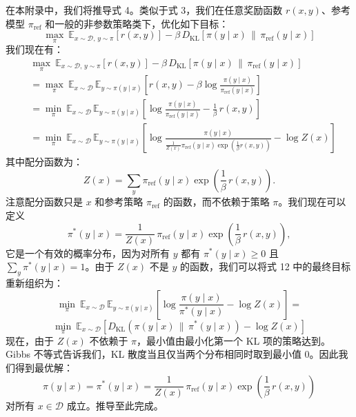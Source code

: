 \documentclass[11pt,UTF8,fontset=fandol]{ctexart}
\newcommand{\KL}{\mathrm{KL}}
\newcommand{\sref}{\mathrm{ref}}
\begin{document}
在本附录中，我们将推导式 4。类似于式 3，我们在任意奖励函数 $r(x, y)$、参考模型 $\pi_\sref$ 和一般的非参数策略类下，优化如下目标：
\begin{equation}
\max_\pi\ \mathbb{E}_{x \sim \mathcal{D},\, y \sim \pi}\left[r(x, y)\right] - \beta\, D_{\KL}\left[\pi(y \mid x) \,\|\, \pi_\sref(y \mid x)\right] \tag{11}
\end{equation}
我们现在有：
\begin{equation}
\begin{aligned}
&\max_\pi\ \mathbb{E}_{x \sim \mathcal{D},\, y \sim \pi}\left[r(x, y)\right] - \beta\, D_{\KL}\left[\pi(y \mid x) \,\|\, \pi_\sref(y \mid x)\right] \\
&= \max_\pi\ \mathbb{E}_{x \sim \mathcal{D}}\, \mathbb{E}_{y \sim \pi(y \mid x)}\left[r(x, y) - \beta \log \frac{\pi(y \mid x)}{\pi_\sref(y \mid x)}\right] \\
&= \min_\pi\ \mathbb{E}_{x \sim \mathcal{D}}\, \mathbb{E}_{y \sim \pi(y \mid x)}\left[\log \frac{\pi(y \mid x)}{\pi_\sref(y \mid x)} - \frac{1}{\beta}\, r(x, y)\right] \\
&= \min_\pi\ \mathbb{E}_{x \sim \mathcal{D}}\, \mathbb{E}_{y \sim \pi(y \mid x)}\left[\log \frac{\pi(y \mid x)}{\frac{1}{Z(x)} \pi_\sref(y \mid x) \exp\left(\frac{1}{\beta} r(x, y)\right)} - \log Z(x)\right]
\end{aligned}
\tag{12}
\end{equation}
其中配分函数为：
\[
Z(x) = \sum_y \pi_\sref(y \mid x) \exp\left(\frac{1}{\beta}\, r(x, y)\right).
\]
注意配分函数只是 $x$ 和参考策略 $\pi_\sref$ 的函数，而不依赖于策略 $\pi$。我们现在可以定义
\[
\pi^*(y \mid x) = \frac{1}{Z(x)}\, \pi_\sref(y \mid x) \exp\left(\frac{1}{\beta}\, r(x, y)\right),
\]
它是一个有效的概率分布，因为对所有 $y$ 都有 $\pi^*(y \mid x) \geq 0$ 且 $\sum_y \pi^*(y \mid x) = 1$。由于 $Z(x)$ 不是 $y$ 的函数，我们可以将式 12 中的最终目标重新组织为：
\begin{equation}
\min_\pi\ \mathbb{E}_{x \sim \mathcal{D}}\, \mathbb{E}_{y \sim \pi(y \mid x)}\left[\log \frac{\pi(y \mid x)}{\pi^*(y \mid x)} - \log Z(x)\right] = \tag{13}
\end{equation}
\begin{equation}
\min_\pi\ \mathbb{E}_{x \sim \mathcal{D}}\left[D_{\KL}\!\left(\pi(y \mid x) \,\|\, \pi^*(y \mid x)\right) - \log Z(x)\right] \tag{14}
\end{equation}
现在，由于 $Z(x)$ 不依赖于 $\pi$，最小值由最小化第一个 KL 项的策略达到。Gibbs 不等式告诉我们，KL 散度当且仅当两个分布相同时取到最小值 0。因此我们得到最优解：
\begin{equation}
\pi(y \mid x) = \pi^*(y \mid x) = \frac{1}{Z(x)}\, \pi_\sref(y \mid x) \exp\left(\frac{1}{\beta}\, r(x, y)\right) \tag{15}
\end{equation}
对所有 $x \in \mathcal{D}$ 成立。推导至此完成。
\end{document}
